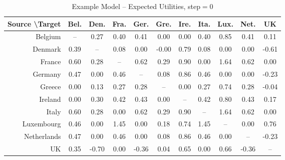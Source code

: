 \begin{table}
\centering
    \caption[Example Model -- Expected Utilities]{Example Model -- Expected Utilities, step$=0$}
    \label{table:eg_eu}
    \begin{tabular}{r|cccccccccc}

        Source  \textbackslash Target &  Bel. &  Den. &  Fra. &  Ger. &  Gre. &  Ire. &  Ita. &  Lux. &  Net. &    UK \\
        \hline
        Belgium     &      -- &     0.27 &    0.40 &     0.41 &    0.00 &     0.00 &   0.40 &        0.85 &         0.41 &  0.11 \\
        Denmark     &     0.39 &      -- &    0.08 &     0.00 &   -0.00 &     0.79 &   0.08 &        0.00 &         0.00 & -0.61 \\
        France      &     0.60 &     0.28 &     -- &     0.62 &    0.29 &     0.90 &   0.00 &        1.64 &         0.62 &  0.00 \\
        Germany     &     0.47 &     0.00 &    0.46 &      -- &    0.08 &     0.86 &   0.46 &        0.00 &         0.00 & -0.23 \\
        Greece      &     0.00 &     0.13 &    0.27 &     0.28 &     -- &     0.00 &   0.27 &        0.74 &         0.28 & -0.04 \\
        Ireland     &     0.00 &     0.30 &    0.42 &     0.43 &    0.00 &      -- &   0.42 &        0.80 &         0.43 &  0.17 \\
        Italy       &     0.60 &     0.28 &    0.00 &     0.62 &    0.29 &     0.90 &    -- &        1.64 &         0.62 &  0.00 \\
        Luxembourg  &     0.46 &     0.00 &    1.45 &     0.00 &    0.18 &     0.74 &   1.45 &         -- &         0.00 &  0.76 \\
        Netherlands &     0.47 &     0.00 &    0.46 &     0.00 &    0.08 &     0.86 &   0.46 &        0.00 &          -- & -0.23 \\
        UK          &     0.35 &    -0.70 &    0.00 &    -0.36 &    0.04 &     0.65 &   0.00 &        0.66 &        -0.36 &   -- \\
    \end{tabular}
    \tableSpace
\end{table}

